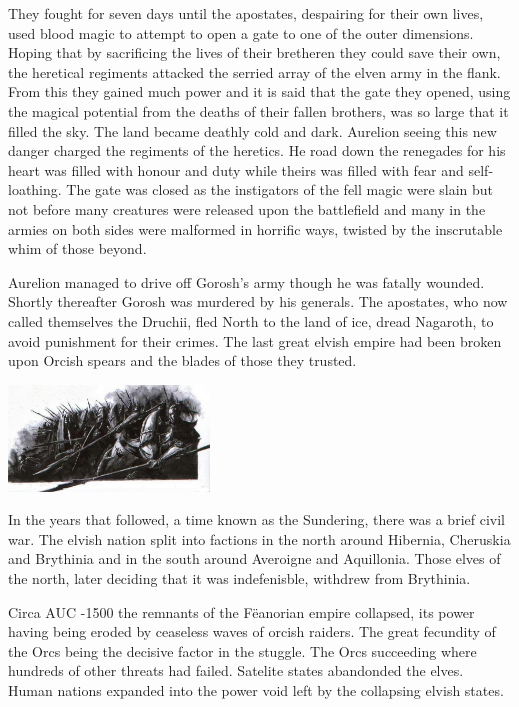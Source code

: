 \documentclass[a4paper]{dnd5}
\begin{document}
They fought for seven days until the apostates, despairing for their own lives, used blood magic to attempt to open a gate to one of the outer dimensions.  Hoping that by sacrificing the lives of their bretheren they could save their own, the heretical regiments attacked the serried array of the elven army in the flank.  From this they gained much power and it is said that the gate they opened, using the magical potential from the deaths of their fallen brothers, was so large that it filled the sky.  The land became deathly cold and dark.  Aurelion seeing this new danger charged the regiments of the heretics.  He road down the renegades for his heart was filled with honour and duty while theirs was filled with fear and self-loathing.  The gate was closed as the instigators of the fell magic were slain but not before many creatures were released upon the battlefield and many in the armies on both sides were malformed in horrific ways, twisted by the inscrutable whim of those beyond.  

Aurelion managed to drive off Gorosh's army though he was fatally wounded.  Shortly thereafter Gorosh was murdered by his generals.  The apostates, who now called themselves the Druchii, fled North to the land of ice, dread Nagaroth, to avoid punishment for their crimes.  The last great elvish empire had been broken upon Orcish spears and the blades of those they trusted.

\begin{flushright}
 \includegraphics[width=0.4\textwidth]{dark_elves.png}
\end{flushright}
  

In the years that followed, a time known as the Sundering, there was a brief civil war.  The elvish nation split into factions in the north around Hibernia, Cheruskia and Brythinia and in the south around Averoigne and Aquillonia.  Those elves of the north, later deciding that it was indefenisble, withdrew from Brythinia.

Circa AUC -1500 the remnants of the Fëanorian empire collapsed, its power having being eroded by ceaseless waves of orcish raiders. The great fecundity of the Orcs being the decisive factor in the stuggle.  The Orcs succeeding where hundreds of other threats had failed.  Satelite states abandonded the elves.  Human nations expanded into the power void left by the collapsing elvish states.
\end{document}
